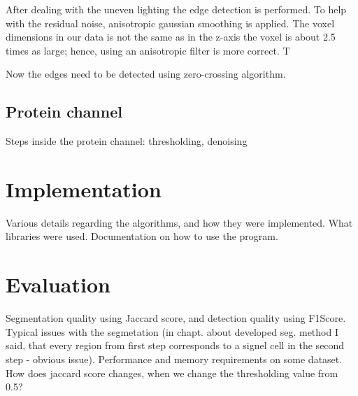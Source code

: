 \documentclass[
  digital,     %
  oneside,     %
  nosansbold,  %
  nocolorbold, %
  lof,         %
  lot,         %
]{fithesis4}
\begin{document}

After dealing with the uneven lighting the edge detection is performed. To help
with the residual noise, anisotropic gaussian smoothing is applied. The voxel
dimensions in our data is not the same as in the z-axis the voxel is about 2.5
times as large; hence, using an anisotropic filter is more correct. T

Now the edges need to be detected using zero-crossing algorithm.


\section{Protein channel}

Steps inside the protein channel: thresholding, denoising

\chapter{Implementation}
Various details regarding the algorithms, and how they were implemented. What
libraries were used. Documentation on how to use the program.

\chapter{Evaluation}
Segmentation quality using Jaccard score, and detection quality using F1Score.
Typical issues with the segmetation (in chapt. about developed seg. method I
said, that every region from first step corresponds to a signel cell in the
second step - obvious issue). Performance and memory requirements on some
dataset. How does jaccard score changes, when we change the thresholding value
from 0.5?
\end{document}

